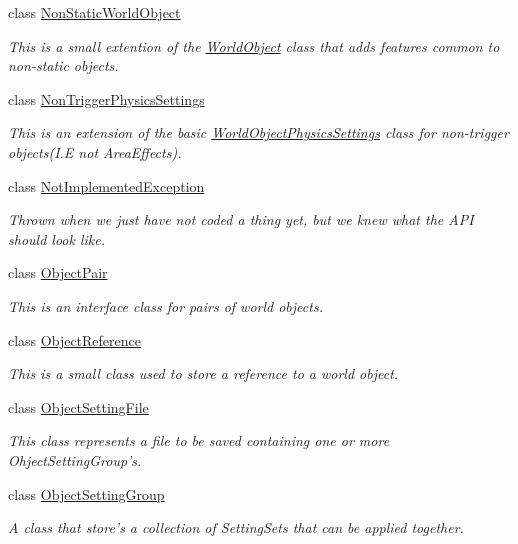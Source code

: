 \begin{DoxyCompactItemize}
class \hyperlink{classMezzanine_1_1NonStaticWorldObject}{Non\-Static\-World\-Object}
\begin{DoxyCompactList}\small\item\em This is a small extention of the \hyperlink{classMezzanine_1_1WorldObject}{World\-Object} class that adds features common to non-\/static objects. \end{DoxyCompactList}\item 
class \hyperlink{classMezzanine_1_1NonTriggerPhysicsSettings}{Non\-Trigger\-Physics\-Settings}
\begin{DoxyCompactList}\small\item\em This is an extension of the basic \hyperlink{classMezzanine_1_1WorldObjectPhysicsSettings}{World\-Object\-Physics\-Settings} class for non-\/trigger objects(I.\-E not Area\-Effects). \end{DoxyCompactList}\item 
class \hyperlink{classMezzanine_1_1NotImplementedException}{Not\-Implemented\-Exception}
\begin{DoxyCompactList}\small\item\em Thrown when we just have not coded a thing yet, but we knew what the A\-P\-I should look like. \end{DoxyCompactList}\item 
class \hyperlink{classMezzanine_1_1ObjectPair}{Object\-Pair}
\begin{DoxyCompactList}\small\item\em This is an interface class for pairs of world objects. \end{DoxyCompactList}\item 
class \hyperlink{classMezzanine_1_1ObjectReference}{Object\-Reference}
\begin{DoxyCompactList}\small\item\em This is a small class used to store a reference to a world object. \end{DoxyCompactList}\item 
class \hyperlink{classMezzanine_1_1ObjectSettingFile}{Object\-Setting\-File}
\begin{DoxyCompactList}\small\item\em This class represents a file to be saved containing one or more Ohject\-Setting\-Group's. \end{DoxyCompactList}\item 
class \hyperlink{classMezzanine_1_1ObjectSettingGroup}{Object\-Setting\-Group}
\begin{DoxyCompactList}\small\item\em A class that store's a collection of Setting\-Sets that can be applied together. \end{DoxyCompactList}\item 

\end{DoxyCompactItemize}
